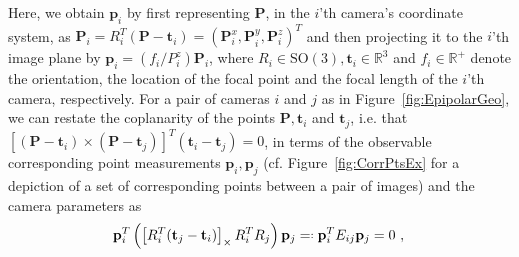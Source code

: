\documentclass[10pt]{article}
\newcommand{\R}{\ensuremath{\mathbb{R}}}
\newcommand*{\eqdef}{=\mathrel{\vcenter{\baselineskip0.5ex \lineskiplimit0pt
                     \hbox{\scriptsize.}\hbox{\scriptsize.}}}
                     }
\begin{document}
Here, we obtain $\mathbf{p}_i$ by first representing $\mathbf {P}$, in the $i$'th camera's coordinate system, as $\mathbf {P}_i = R_i^T(\mathbf{P} - \mathbf{t}_i) = (\mathbf{P}_i^x,\mathbf{P}_i^y,\mathbf{P}_i^z)^T$ and then projecting it to the $i$'th image plane by $\mathbf{p}_i = (f_i/P_i^z)\mathbf{P}_i$, where $R_i\in\mbox{SO}(3), \mathbf{t}_i\in\R^3$ and $f_i\in\R^+$ denote the orientation, the location of the focal point and the focal length of the $i$'th camera, respectively. For a pair of cameras $i$ and $j$ as in Figure~\ref{fig:EpipolarGeo}, we can restate the coplanarity of the points $\mathbf{P},\mathbf{t}_i$ and $\mathbf{t}_j$, i.e. that $[(\mathbf{P} - \mathbf{t}_i)\times(\mathbf{P} - \mathbf{t}_j)]^T(\mathbf{t}_i-\mathbf{t}_j) = 0$, in terms of the observable corresponding point measurements $\mathbf{p}_i, \mathbf{p}_j$ (cf. Figure~\ref{fig:CorrPtsEx} for a depiction of a set of corresponding points between a pair of images) and the camera parameters as
\begin{equation}
\label{eq:EpipolarConst}
\mathbf{p}_i^T\left(\left[R_i^T(\mathbf{t}_{j}-\mathbf{t}_{i})\right]_{\times}R_{i}^TR_j\right)\mathbf{p}_j \eqdef \mathbf{p}_i^TE_{ij}\mathbf{p}_j  = 0 \ , \\
\end{equation}
\end{document}
